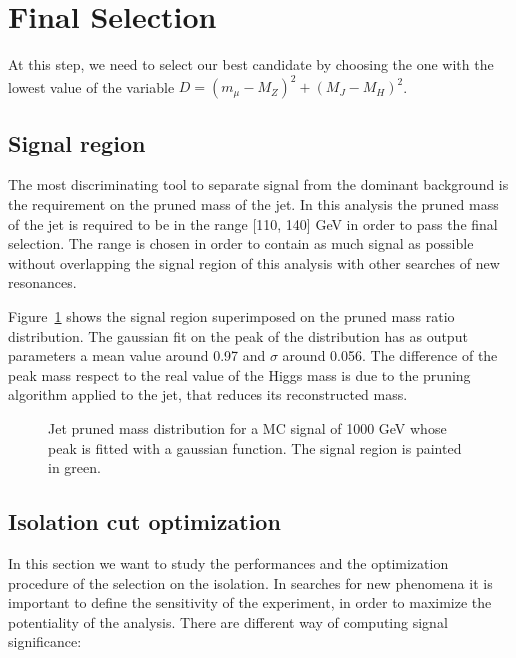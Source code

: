 \documentclass[12pt]{article} %
\begin{document}
\newpage



\section{Final Selection} 

At this step, we need to select our best candidate by choosing the one with the lowest value of the variable $D = (m_\mu - M_Z)^2 + (M_J - M_H)^2$.


\subsection{Signal region} %
 
The most discriminating tool to separate signal from the dominant background is the requirement on the pruned mass of the jet. In this analysis the pruned mass of the jet is required to be in the range [110, 140] GeV in order to pass the final selection. The range is chosen in order to contain as much signal as possible without overlapping the signal region of this analysis with other searches of new resonances.

Figure~\ref{fig:fitZpMass} shows the signal region superimposed on the pruned mass ratio distribution. The gaussian fit on the peak of the distribution has as output parameters a mean value around 0.97 and $\sigma$ around 0.056. The difference of the peak mass respect to the real value of the Higgs mass is due to the pruning algorithm applied to the jet, that reduces its reconstructed mass.

\begin{figure}[H] %
  \caption{Jet pruned mass distribution for a MC signal of 1000 GeV whose peak is fitted with a gaussian function. The signal region is painted in green.}
  \label{fig:fitZpMass}
\end{figure}


\subsection{Isolation cut optimization} %

In this section we want to study the performances and the optimization procedure of the selection on the isolation. In searches for new phenomena it is important to define the sensitivity of the experiment, in order to maximize the potentiality of the analysis. There are different way of computing signal significance: 
\end{document}
